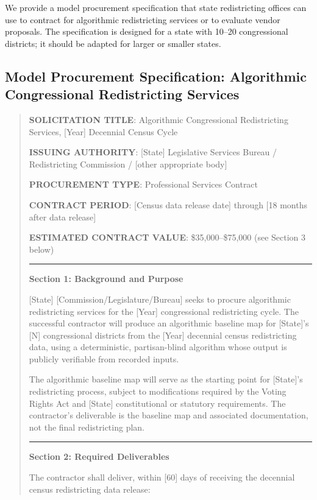 We provide a model procurement specification that state redistricting offices can use to contract for algorithmic redistricting services or to evaluate vendor proposals. The specification is designed for a state with 10--20 congressional districts; it should be adapted for larger or smaller states.

\subsection{Model Procurement Specification: Algorithmic Congressional Redistricting Services}

\begin{quote}
\textbf{SOLICITATION TITLE}: Algorithmic Congressional Redistricting Services, [Year] Decennial Census Cycle

\textbf{ISSUING AUTHORITY}: [State] Legislative Services Bureau / Redistricting Commission / [other appropriate body]

\textbf{PROCUREMENT TYPE}: Professional Services Contract

\textbf{CONTRACT PERIOD}: [Census data release date] through [18 months after data release]

\textbf{ESTIMATED CONTRACT VALUE}: \$35,000--\$75,000 (see Section 3 below)

\rule{\linewidth}{0.4pt}

\textbf{Section 1: Background and Purpose}

[State] [Commission/Legislature/Bureau] seeks to procure algorithmic redistricting services for the [Year] congressional redistricting cycle. The successful contractor will produce an algorithmic baseline map for [State]'s [N] congressional districts from the [Year] decennial census redistricting data, using a deterministic, partisan-blind algorithm whose output is publicly verifiable from recorded inputs.

The algorithmic baseline map will serve as the starting point for [State]'s redistricting process, subject to modifications required by the Voting Rights Act and [State] constitutional or statutory requirements. The contractor's deliverable is the baseline map and associated documentation, not the final redistricting plan.

\rule{\linewidth}{0.4pt}

\textbf{Section 2: Required Deliverables}

The contractor shall deliver, within [60] days of receiving the decennial census redistricting data release:


\end{quote}
